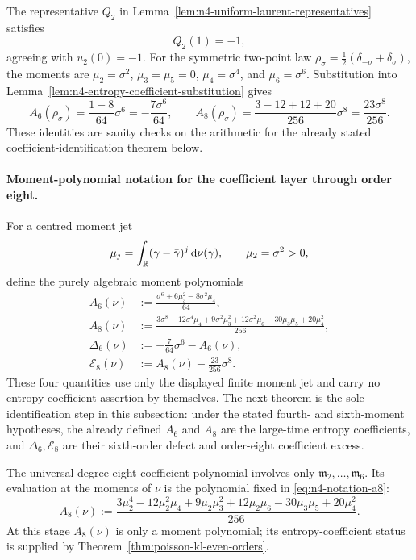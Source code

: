 \begin{remark}
The representative \(Q_2\) in
Lemma~\ref{lem:n4-uniform-laurent-representatives} satisfies
\[
Q_2(1)=-1,
\]
agreeing with \(u_2(0)=-1\).  For the symmetric two-point law
\(\rho_\sigma=\tfrac12(\delta_{-\sigma}+\delta_\sigma)\), the moments are
\(\mu_2=\sigma^2\), \(\mu_3=\mu_5=0\), \(\mu_4=\sigma^4\), and
\(\mu_6=\sigma^6\).  Substitution into
Lemma~\ref{lem:n4-entropy-coefficient-substitution} gives
\[
A_6(\rho_\sigma)=\frac{1-8}{64}\sigma^6
=-\frac{7\sigma^6}{64},
\qquad
A_8(\rho_\sigma)=\frac{3-12+12+20}{256}\sigma^8
=\frac{23\sigma^8}{256}.
\]
These identities are sanity checks on the arithmetic for the already stated
coefficient-identification theorem below.
\end{remark}

\paragraph{Moment-polynomial notation for the coefficient layer through order eight.}%
\label{par:eighth-order-coefficient-notation}
For a centred moment jet
\[
\mu_j=\int_{\mathbb{R}}(\gamma-\bar{\gamma})^j\,\mathrm{d}\nu(\gamma),
\qquad \mu_2=\sigma^2>0,
\]
define the purely algebraic moment polynomials
\begin{align}
A_6(\nu)
&:=\frac{\sigma^6+6\mu_3^2-8\sigma^2\mu_4}{64},
\label{eq:n4-notation-a6}\\
A_8(\nu)
&:=\frac{3\sigma^8-12\sigma^4\mu_4+9\sigma^2\mu_3^2
+12\sigma^2\mu_6-30\mu_3\mu_5+20\mu_4^2}{256},
\label{eq:n4-notation-a8}\\
\Delta_6(\nu)
&:=-\frac{7}{64}\sigma^6-A_6(\nu),
\label{eq:n4-notation-delta6}\\
\mathcal E_8(\nu)
&:=A_8(\nu)-\frac{23}{256}\sigma^8.
\label{eq:n4-notation-e8}
\end{align}
These four quantities use only the displayed finite moment jet and carry no
entropy-coefficient assertion by themselves.  The next theorem is the sole
identification step in this subsection: under the stated fourth- and
sixth-moment hypotheses, the already defined \(A_6\) and \(A_8\) are the
large-time entropy coefficients, and \(\Delta_6,\mathcal E_8\) are their
sixth-order defect and order-eight coefficient excess.

\begin{lemma}%
\label{lem:formal-seventh-eighth-coefficient}
The universal degree-eight coefficient polynomial involves only
\(\mathfrak m_2,\ldots,\mathfrak m_6\).  Its evaluation at the moments of
\(\nu\) is the polynomial fixed in
\eqref{eq:n4-notation-a8}:
\begin{equation}\label{eq:formal-eighth-evaluated-polynomial}
A_8(\nu)
:=
\frac{3\mu_2^4-12\mu_2^2\mu_4+9\mu_2\mu_3^2
+12\mu_2\mu_6-30\mu_3\mu_5+20\mu_4^2}{256}.
\end{equation}
At this stage \(A_8(\nu)\) is only a moment polynomial; its
entropy-coefficient status is supplied by
Theorem~\ref{thm:poisson-kl-even-orders}.
\end{lemma}

